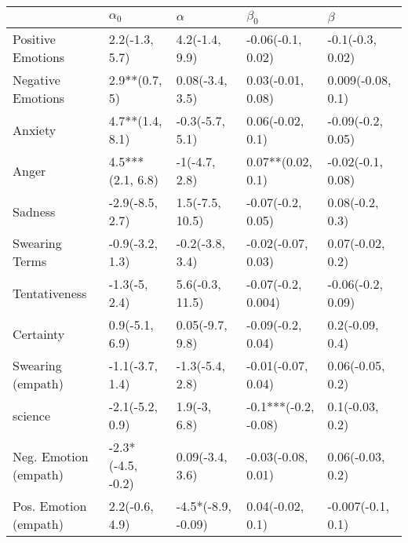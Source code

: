 \begin{tabular}{lllll}
\toprule
{} &         $\alpha_0$ &            $\alpha$ &             $\beta_0$ &            $\beta$ \\
\midrule
Positive Emotions     &     2.2(-1.3, 5.7) &      4.2(-1.4, 9.9) &     -0.06(-0.1, 0.02) &   -0.1(-0.3, 0.02) \\
Negative Emotions     &      2.9**(0.7, 5) &     0.08(-3.4, 3.5) &     0.03(-0.01, 0.08) &  0.009(-0.08, 0.1) \\
Anxiety               &    4.7**(1.4, 8.1) &     -0.3(-5.7, 5.1) &      0.06(-0.02, 0.1) &  -0.09(-0.2, 0.05) \\
Anger                 &   4.5***(2.1, 6.8) &       -1(-4.7, 2.8) &     0.07**(0.02, 0.1) &  -0.02(-0.1, 0.08) \\
Sadness               &    -2.9(-8.5, 2.7) &     1.5(-7.5, 10.5) &     -0.07(-0.2, 0.05) &    0.08(-0.2, 0.3) \\
Swearing Terms        &    -0.9(-3.2, 1.3) &     -0.2(-3.8, 3.4) &    -0.02(-0.07, 0.03) &   0.07(-0.02, 0.2) \\
Tentativeness         &      -1.3(-5, 2.4) &     5.6(-0.3, 11.5) &    -0.07(-0.2, 0.004) &  -0.06(-0.2, 0.09) \\
Certainty             &     0.9(-5.1, 6.9) &     0.05(-9.7, 9.8) &     -0.09(-0.2, 0.04) &    0.2(-0.09, 0.4) \\
Swearing (empath)     &    -1.1(-3.7, 1.4) &     -1.3(-5.4, 2.8) &    -0.01(-0.07, 0.04) &   0.06(-0.05, 0.2) \\
science               &    -2.1(-5.2, 0.9) &        1.9(-3, 6.8) &  -0.1***(-0.2, -0.08) &    0.1(-0.03, 0.2) \\
Neg. Emotion (empath) &  -2.3*(-4.5, -0.2) &     0.09(-3.4, 3.6) &    -0.03(-0.08, 0.01) &   0.06(-0.03, 0.2) \\
Pos. Emotion (empath) &     2.2(-0.6, 4.9) &  -4.5*(-8.9, -0.09) &      0.04(-0.02, 0.1) &  -0.007(-0.1, 0.1) \\
\bottomrule
\end{tabular}
